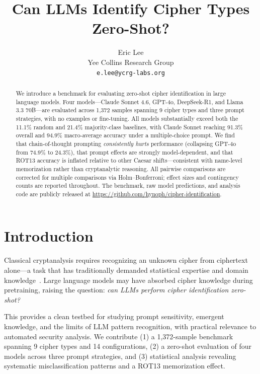 \documentclass{article}
\title{Can LLMs Identify Cipher Types Zero-Shot?}
\author{Eric Lee \\
  Yee Collins Research Group \\
  \small\texttt{e.lee@ycrg-labs.org}
}
\date{}
\begin{document}
\maketitle

\begin{abstract}
We introduce a benchmark for evaluating zero-shot cipher identification in large
language models.
Four models---Claude Sonnet 4.6, GPT-4o, DeepSeek-R1, and Llama 3.3 70B---are
evaluated across 1,372 samples spanning 9 cipher types and three prompt strategies,
with no examples or fine-tuning.
All models substantially exceed both the 11.1\% random and 21.4\% majority-class
baselines, with Claude Sonnet reaching 91.3\% overall and 94.9\% macro-average
accuracy under a multiple-choice prompt.
We find that chain-of-thought prompting \emph{consistently hurts} performance
(collapsing GPT-4o from 74.9\% to 24.3\%), that prompt effects are strongly
model-dependent, and that ROT13 accuracy is inflated relative to other Caesar
shifts---consistent with name-level memorization rather than cryptanalytic reasoning.
All pairwise comparisons are corrected for multiple comparisons via Holm--Bonferroni;
effect sizes and contingency counts are reported throughout.
The benchmark, raw model predictions, and analysis code are publicly released at
\url{https://github.com/hynoph/cipher-identification}.
\end{abstract}

\section{Introduction}

Classical cryptanalysis requires recognizing an unknown cipher from ciphertext
alone---a task that has traditionally demanded statistical expertise and domain
knowledge~\citep{sinkov1966elementary}.
Large language models may have absorbed cipher knowledge during pretraining,
raising the question: \emph{can LLMs perform cipher identification zero-shot?}

This provides a clean testbed for studying prompt sensitivity, emergent knowledge,
and the limits of LLM pattern recognition, with practical relevance to automated
security analysis.
We contribute (1) a 1,372-sample benchmark spanning 9 cipher types and 14
configurations, (2) a zero-shot evaluation of four models across three prompt
strategies, and (3) statistical analysis revealing systematic misclassification
patterns and a ROT13 memorization effect.
\end{document}
